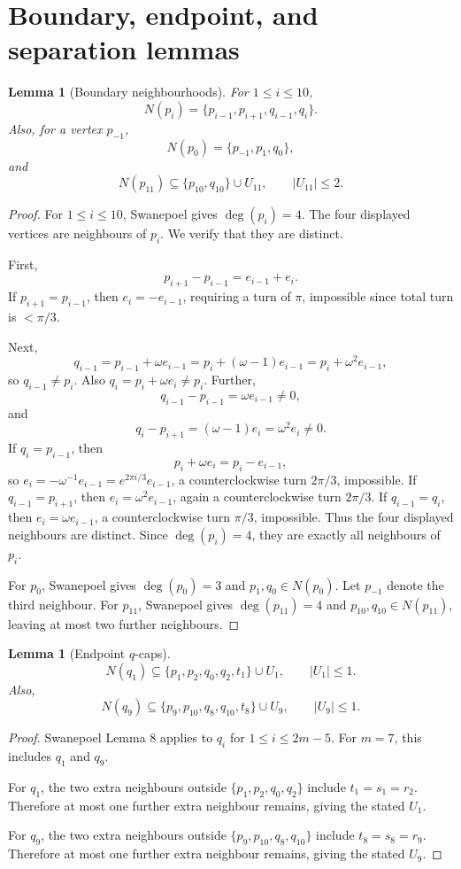\documentclass[11pt]{article}
\newtheorem{lemma}[theorem]{Lemma}
\begin{document}
\section{Boundary, endpoint, and separation lemmas}

\begin{lemma}[Boundary neighbourhoods]\label{lem:boundary-nbhd}
For $1\le i\le 10$,
\[
 N(p_i)=\{p_{i-1},p_{i+1},q_{i-1},q_i\}.
\]
Also, for a vertex $p_{-1}$,
\[
 N(p_0)=\{p_{-1},p_1,q_0\},
\]
and
\[
 N(p_{11})\subseteq \{p_{10},q_{10}\}\cup U_{11},
 \qquad |U_{11}|\le2.
\]
\end{lemma}

\begin{proof}
For $1\le i\le10$, Swanepoel gives $\deg(p_i)=4$. The four displayed vertices are neighbours of $p_i$. We verify that they are distinct.

First,
\[
 p_{i+1}-p_{i-1}=e_{i-1}+e_i.
\]
If $p_{i+1}=p_{i-1}$, then $e_i=-e_{i-1}$, requiring a turn of $\pi$, impossible since total turn is $<\pi/3$.

Next,
\[
 q_{i-1}=p_{i-1}+\omega e_{i-1}=p_i+(\omega-1)e_{i-1}=p_i+\omega^2e_{i-1},
\]
so $q_{i-1}\ne p_i$. Also $q_i=p_i+\omega e_i\ne p_i$.
Further,
\[
 q_{i-1}-p_{i-1}=\omega e_{i-1}\ne0,
\]
and
\[
 q_i-p_{i+1}=(\omega-1)e_i=\omega^2e_i\ne0.
\]
If $q_i=p_{i-1}$, then
\[
 p_i+\omega e_i=p_i-e_{i-1},
\]
so $e_i=-\omega^{-1}e_{i-1}=e^{2\pi i/3}e_{i-1}$, a counterclockwise turn $2\pi/3$, impossible.
If $q_{i-1}=p_{i+1}$, then $e_i=\omega^2e_{i-1}$, again a counterclockwise turn $2\pi/3$.
If $q_{i-1}=q_i$, then $e_i=\omega e_{i-1}$, a counterclockwise turn $\pi/3$, impossible.
Thus the four displayed neighbours are distinct. Since $\deg(p_i)=4$, they are exactly all neighbours of $p_i$.

For $p_0$, Swanepoel gives $\deg(p_0)=3$ and $p_1,q_0\in N(p_0)$. Let $p_{-1}$ denote the third neighbour. For $p_{11}$, Swanepoel gives $\deg(p_{11})=4$ and $p_{10},q_{10}\in N(p_{11})$, leaving at most two further neighbours.
\end{proof}

\begin{lemma}[Endpoint $q$-caps]\label{lem:q-caps}
\[
 N(q_1)\subseteq \{p_1,p_2,q_0,q_2,t_1\}\cup U_1,
 \qquad |U_1|\le1.
\]
Also,
\[
 N(q_9)\subseteq \{p_9,p_{10},q_8,q_{10},t_8\}\cup U_9,
 \qquad |U_9|\le1.
\]
\end{lemma}

\begin{proof}
Swanepoel Lemma 8 applies to $q_i$ for $1\le i\le 2m-5$. For $m=7$, this includes $q_1$ and $q_9$.

For $q_1$, the two extra neighbours outside $\{p_1,p_2,q_0,q_2\}$ include $t_1=s_1=r_2$. Therefore at most one further extra neighbour remains, giving the stated $U_1$.

For $q_9$, the two extra neighbours outside $\{p_9,p_{10},q_8,q_{10}\}$ include $t_8=s_8=r_9$. Therefore at most one further extra neighbour remains, giving the stated $U_9$.
\end{proof}
\end{document}

